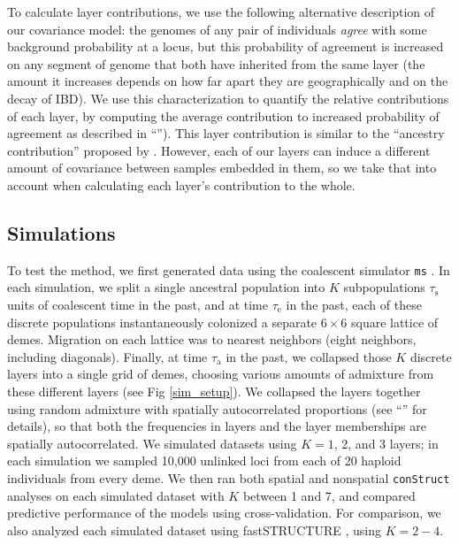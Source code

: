 \documentclass[10pt,letterpaper]{article}
\newcommand{\secref}[1]{``\nameref{#1}''}
\begin{document}
To calculate layer contributions, we use the following alternative description of our covariance model:
the genomes of any pair of individuals \emph{agree} with some
background probability at a locus,
but this probability of agreement is increased on any segment of genome 
that both have inherited from the same layer 
(the amount it increases depends on how far apart they are
geographically and on the decay of IBD).
We use this characterization to quantify the relative contributions of each layer,
by computing the average contribution to increased probability of agreement
as described in \secref{layer_contribution}). 
This layer contribution is similar to the ``ancestry contribution'' proposed by \cite{fastStructure}. 
However, each of our layers can induce a different amount of covariance between samples embedded in them, 
so we take that into account when calculating each layer's contribution to the whole.


\subsection*{Simulations}

To test the method, we first generated data using the coalescent simulator \texttt{ms} \cite{Hudson2002}.
In each simulation,
we split a single ancestral population into $K$ subpopulations $\tau_{\text{s}}$ units of coalescent time in the past,
and at time $\tau_{\text{e}}$ in the past,
each of these discrete populations instantaneously colonized a
separate $6 \times 6$ square lattice of demes.
Migration on each lattice was to nearest neighbors (eight neighbors, including diagonals).
Finally, at time $\tau_{\text{a}}$ in the past, 
we collapsed those $K$ discrete layers into a single grid of demes,
choosing various amounts of admixture from these different layers
(see Fig \ref{sim_setup}). 
We collapsed the layers together using random admixture with spatially autocorrelated proportions 
(see \secref{sim_details} for details), 
so that both the frequencies in layers and the layer memberships are
spatially autocorrelated. 
We simulated datasets using $K=1$, 2, and 3 layers;
in each simulation we sampled 10,000 unlinked loci from each of 20 haploid individuals from every deme.
We then ran both spatial and nonspatial \texttt{conStruct} analyses on each simulated dataset with $K$ between 1 and 7,
and compared predictive performance of the models using cross-validation.
For comparison,
we also analyzed each simulated dataset using fastSTRUCTURE \cite{fastStructure}, using $K=2-4$.
\end{document}
